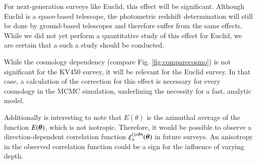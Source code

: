 For next-generation surveys like Euclid, this effect will be significant. Although Euclid is a space-based telescope, the photometric redshift determination will still be done by ground-based telescopes and therefore suffer from the same effects. While we did not yet perform a quantitative study of this effect for Euclid, we are certain that a such a study should be conducted.

While the cosmology dependency (compare Fig. \ref{fig:comparecosmo}) is not significant for the KV450 survey, it will be relevant for the Euclid survey. In that case, a calculation of the correction for this effect is necessary for every cosmology in the MCMC simulation, underlining the necessity for a fast, analytic model.

Additionally is interesting to note that $E(\theta)$ is the azimuthal average of the function $E(\bm{\theta})$, which is not isotropic. Therefore, it would be possible to observe a direction-dependent correlation function $\xi_\pm^{ij,\mathrm{obs}}(\bm{\theta})$ in future surveys. An anisotropy in the observed correlation function could be a sign for the influence of varying depth.
